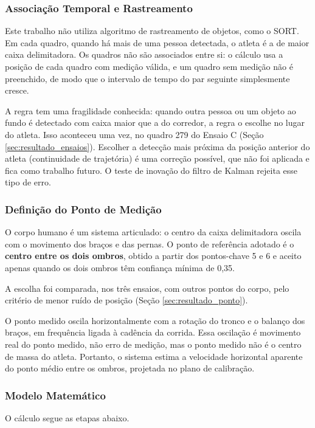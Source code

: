 \documentclass[
    12pt,               %
    openright,          %
    twoside,            %
    a4paper,            %
    chapter=TITLE,      %
    english,            %
    brazil              %
    ]{abntex2}
\begin{document}
\subsubsection{Associação Temporal e Rastreamento}
\label{sec:selecao}
Este trabalho não utiliza algoritmo de rastreamento de objetos, como o SORT. Em cada quadro, quando há mais de uma pessoa detectada, o atleta é a de maior caixa delimitadora. Os quadros não são associados entre si: o cálculo usa a posição de cada quadro com medição válida, e um quadro sem medição não é preenchido, de modo que o intervalo de tempo do par seguinte simplesmente cresce.

A regra tem uma fragilidade conhecida: quando outra pessoa ou um objeto ao fundo é detectado com caixa maior que a do corredor, a regra o escolhe no lugar do atleta. Isso aconteceu uma vez, no quadro 279 do Ensaio C (Seção \ref{sec:resultado_ensaios}). Escolher a detecção mais próxima da posição anterior do atleta (continuidade de trajetória) é uma correção possível, que não foi aplicada e fica como trabalho futuro. O teste de inovação do filtro de Kalman rejeita esse tipo de erro.

\subsubsection{Definição do Ponto de Medição}
O corpo humano é um sistema articulado: o centro da caixa delimitadora oscila com o movimento dos braços e das pernas. O ponto de referência adotado é o \textbf{centro entre os dois ombros}, obtido a partir dos pontos-chave 5 e 6 e aceito apenas quando os dois ombros têm confiança mínima de 0,35.

A escolha foi comparada, nos três ensaios, com outros pontos do corpo, pelo critério de menor ruído de posição (Seção \ref{sec:resultado_ponto}).

O ponto medido oscila horizontalmente com a rotação do tronco e o balanço dos braços, em frequência ligada à cadência da corrida. Essa oscilação é movimento real do ponto medido, não erro de medição, mas o ponto medido não é o centro de massa do atleta. Portanto, o sistema estima a velocidade horizontal aparente do ponto médio entre os ombros, projetada no plano de calibração.

\subsubsection{Modelo Matemático}
O cálculo segue as etapas abaixo.
\end{document}
